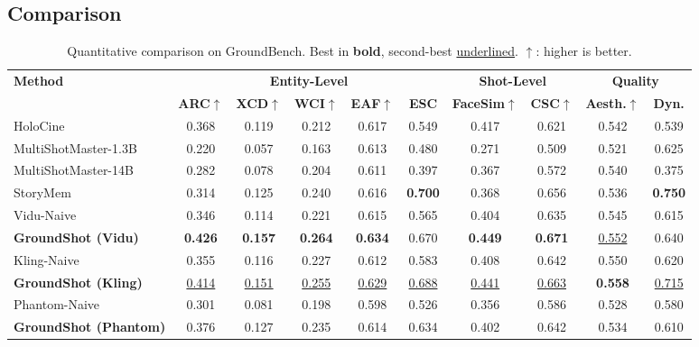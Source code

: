 \subsection{Comparison}

\begin{table}[t]
\centering
\footnotesize
\caption{Quantitative comparison on GroundBench. Best in \textbf{bold}, second-best \underline{underlined}. $\uparrow$: higher is better.}
\label{tab:main_results}
\vspace{0.3em}
\setlength{\tabcolsep}{4pt}
\begin{tabular*}{\textwidth}{@{\extracolsep{\fill}}l|ccccc|cc|cc}
\toprule
\multirow{2}{*}{\textbf{Method}} & \multicolumn{5}{c|}{\textbf{Entity-Level}} & \multicolumn{2}{c|}{\textbf{Shot-Level}} & \multicolumn{2}{c}{\textbf{Quality}} \\
\cmidrule(lr){2-6}\cmidrule(lr){7-8}\cmidrule(lr){9-10}
& \textbf{ARC}$\uparrow$ & \textbf{XCD}$\uparrow$ & \textbf{WCI}$\uparrow$ & \textbf{EAF}$\uparrow$ & \textbf{ESC} & \textbf{FaceSim}$\uparrow$ & \textbf{CSC}$\uparrow$ & \textbf{Aesth.}$\uparrow$ & \textbf{Dyn.} \\
\midrule
HoloCine~\cite{holocine}                    & 0.368 & 0.119 & 0.212 & 0.617 & 0.549 & 0.417 & 0.621 & 0.542 & 0.539 \\
MultiShotMaster-1.3B~\cite{multishotmaster} & 0.220 & 0.057 & 0.163 & 0.613 & 0.480 & 0.271 & 0.509 & 0.521 & 0.625 \\
MultiShotMaster-14B~\cite{multishotmaster}  & 0.282 & 0.078 & 0.204 & 0.611 & 0.397 & 0.367 & 0.572 & 0.540 & 0.375 \\
StoryMem~\cite{storymem}                    & 0.314 & 0.125 & 0.240 & 0.616 & \textbf{0.700} & 0.368 & 0.656 & 0.536 & \textbf{0.750} \\
\midrule
Vidu-Naive                                  & 0.346 & 0.114 & 0.221 & 0.615 & 0.565 & 0.404 & 0.635 & 0.545 & 0.615 \\
\textbf{GroundShot (Vidu)}                         & \textbf{0.426} & \textbf{0.157} & \textbf{0.264} & \textbf{0.634} & 0.670 & \textbf{0.449} & \textbf{0.671} & \underline{0.552} & 0.640 \\
\midrule
Kling-Naive                                 & 0.355 & 0.116 & 0.227 & 0.612 & 0.583 & 0.408 & 0.642 & 0.550 & 0.620 \\
\textbf{GroundShot (Kling)}                        & \underline{0.414} & \underline{0.151} & \underline{0.255} & \underline{0.629} & \underline{0.688} & \underline{0.441} & \underline{0.663} & \textbf{0.558} & \underline{0.715} \\
\midrule
Phantom-Naive                               & 0.301 & 0.081 & 0.198 & 0.598 & 0.526 & 0.356 & 0.586 & 0.528 & 0.580 \\
\textbf{GroundShot (Phantom)}                      & 0.376 & 0.127 & 0.235 & 0.614 & 0.634 & 0.402 & 0.642 & 0.534 & 0.610 \\
\bottomrule
\end{tabular*}
\end{table}

